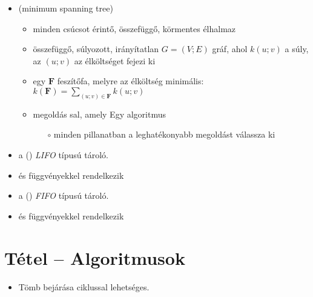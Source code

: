 \documentclass[main.tex]{subfiles}
\begin{document}
\begin{itemize}
    \item {}
    (minimum spanning tree)
    \begin{itemize}
      \item minden csúcsot érintő, összefüggő,
      körmentes élhalmaz

      \item {} összefüggő, súlyozott,
      irányítatlan $G = (V; E)$ gráf, ahol $k(u; v)$
      a súly, az $(u;v)$ az élköltséget fejezi ki

      \item {} egy $\mathbf{F}$ feszítőfa,
      melyre az élköltség minimális:
      $k(\mathbf{F}) = \displaystyle\sum_{(u;v) \in \mathbf{F}} k(u;v)$
      
      \item megoldás sal, amely Egy
       algoritmus
      \begin{itemize}
        \item[$\circ$] minden pillanatban a leghatékonyabb megoldást válassza ki
      \end{itemize}
    \end{itemize}
  \end{itemize}

  \begin{itemize}
    \item a  () \textit{LIFO}
    típusú tároló.

    \item {} és  függvényekkel rendelkezik
  \end{itemize}

  \begin{itemize}
    \item a  () \textit{FIFO}
    típusú tároló.

    \item {} és  függvényekkel rendelkezik
  \end{itemize}



  \section{Tétel – Algoritmusok} %
  
  \begin{itemize}
    \item Tömb bejárása  ciklussal lehetséges.
  \end{itemize}
  
\end{document}
